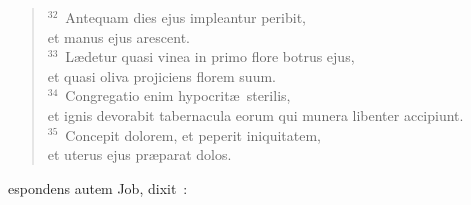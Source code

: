 \begin{flushleft}
\begin{verse}
${}^{32}$~Antequam dies ejus impleantur peribit,\\ et manus ejus arescent.\\
${}^{33}$~L\ae detur quasi vinea in primo flore botrus ejus,\\ et quasi oliva projiciens florem suum.\\
${}^{34}$~Congregatio enim hypocrit\ae\ sterilis,\\ et ignis devorabit tabernacula eorum qui munera libenter accipiunt.\\
${}^{35}$~Concepit dolorem, et peperit iniquitatem,\\ et uterus ejus pr\ae parat dolos.\end{verse}\end{flushleft}



\bchapter
{}espondens autem Job, dixit~:
